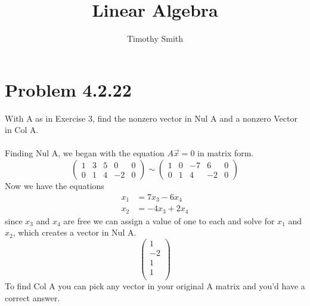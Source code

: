 \documentclass{article}
\begin{document}
\author{Timothy Smith}
\title{Linear Algebra}
\maketitle

\section*{Problem 4.2.22}
With A as in Exercise 3, find the nonzero vector in Nul A and a nonzero Vector in Col A.\\
\\
Finding Nul A, we began with the equation $ A\vec{x}=0$ in matrix form.
\[
\begin{pmatrix}
1 & 3 &5 & 0& 0 \\
0 &1 &4 &-2 & 0
\end{pmatrix}
\sim
\begin{pmatrix}
1 & 0 &-7 &6 & 0\\
0 & 1 & 4 &-2 & 0
\end{pmatrix}
\]
Now we have the equations 
\begin{align*}
 x_1 &= 7x_3 -6x_4\\
 x_2 &=-4x_3+2x_4 
\end{align*}
since $ x_3$ and $x_4$ are free we can assign a value of one to each and solve for $x_1$ and $ x_2$, which creates a vector in Nul A.
\[
\begin{pmatrix}
1 \\
-2\\
1\\
1\\
\end{pmatrix}
\]
 To find Col A  you can pick any vector in your original A matrix and you'd have a correct answer. 
\end{document}
